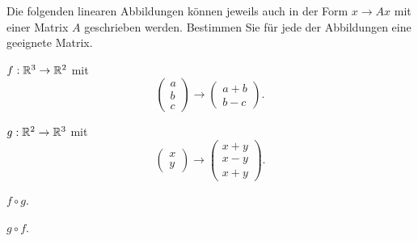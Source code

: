 \begin{Problem}
Die folgenden linearen Abbildungen können jeweils auch in der Form $x\to Ax$ mit einer Matrix $A$ geschrieben werden. Bestimmen Sie für jede der Abbildungen eine geeignete Matrix. 	
\begin{parts}
\item $f:\mathbb{R}^3\to \mathbb{R}^2$ mit
	\[
	\begin{pmatrix} a \\ b \\ c \end{pmatrix} \to \begin{pmatrix} a +b\\b-c \end{pmatrix} 
	.\] 
\item $g:\mathbb{R}^2\to \mathbb{R}^3$ mit
	\[
	\begin{pmatrix} x \\ y \end{pmatrix} \to \begin{pmatrix} x+y\\x-y\\x+y \end{pmatrix} 
	.\] 
\item $f\circ g$.
\item $g\circ f$.
\end{parts}
\end{Problem}

